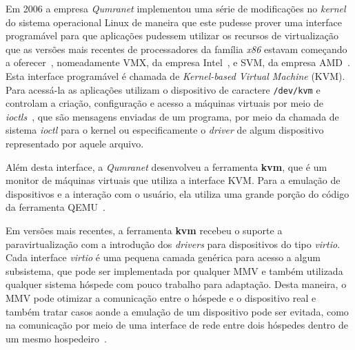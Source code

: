 Em 2006 a empresa \emph{Qumranet} implementou uma série de modificações no
\emph{kernel} do sistema operacional Linux de maneira que este pudesse prover
uma interface programável para que aplicações pudessem utilizar os recursos de
virtualização que as versões mais recentes de processadores da família
\emph{x86} estavam começando a oferecer~\cite{kerneltrap2007avi}, nomeadamente
VMX, da empresa Intel~\cite{uhlig2005intel}, e SVM, da empresa
AMD~\cite{strongin2005trusted}.  Esta interface programável é chamada de
\emph{Kernel-based Virtual Machine} (KVM). Para acessá-la as aplicações
utilizam o dispositivo de caractere \texttt{/dev/kvm} e controlam a criação,
configuração e acesso a máquinas virtuais por meio de
\emph{ioctls}~\cite{kivity2007kvm}, que são mensagens enviadas de um programa,
por meio da chamada de sistema \emph{ioctl} para o kernel ou especificamente o
\emph{driver} de algum dispositivo representado por aquele arquivo.

Além desta interface, a \emph{Qumranet} desenvolveu a ferramenta \textbf{kvm},
que é um monitor de máquinas virtuais que utiliza a interface KVM. Para a
emulação de dispositivos e a interação com o usuário, ela utiliza uma grande
porção do código da ferramenta QEMU~\cite{kerneltrap2007avi}.

Em versões mais recentes, a ferramenta \textbf{kvm} recebeu o suporte a
paravirtualização com a introdução dos \emph{drivers} para dispositivos do tipo
\emph{virtio}. Cada interface \emph{virtio} é uma pequena camada genérica para
acesso a algum subsistema, que pode ser implementada por qualquer MMV e também
utilizada qualquer sistema hóspede com pouco trabalho para adaptação. Desta
maneira, o MMV pode otimizar a comunicação entre o hóspede e o dispositivo real
e também tratar casos aonde a emulação de um dispositivo pode ser evitada, como
na comunicação por meio de uma interface de rede entre dois hóspedes dentro de
um mesmo hospedeiro~\cite{russell2008virtio}.




\subsection{\libvirt}\label{sec:libvirt}


